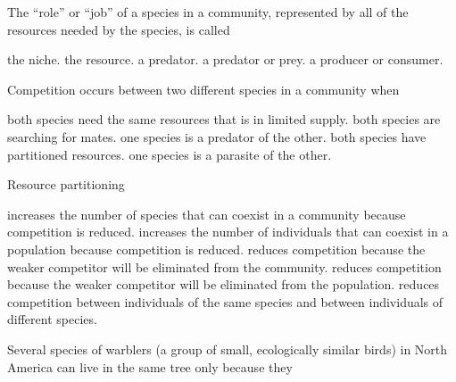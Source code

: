 
\question

\begin{choices}
\correctchoice   %
\choice  %
\choice  %
\choice  %
\choice  %
\end{choices}




\question
The ``role'' or ``job'' of a species in a community, represented by all of the resources needed by the species, is called 

\begin{choices}
	\correctchoice the niche.%
	\choice the resource.%
	\choice a predator.%
	\choice a predator or prey.%
	\choice a producer or consumer.%
\end{choices}


\question
Competition occurs between two different species in a community when

\begin{choices}
	\correctchoice both species need the same resources that is in limited supply.%
	\choice both species are searching for mates.%
	\choice one species is a predator of the other.%
	\choice both species have partitioned resources.%
	\choice one species is a parasite of the other.%
\end{choices}

\question
Resource partitioning

\begin{choices}
	\correctchoice increases the number of species that can coexist in a community because competition is reduced.%
	\choice increases the number of individuals that can coexist in a population because competition is reduced.%
	\choice reduces competition because the weaker competitor will be eliminated from the community.%
	\choice reduces competition because the weaker competitor will be eliminated from the population.%
	\choice reduces competition between individuals of the same species and between individuals of different species.%
\end{choices}

\question
Several species of warblers (a group of small, ecologically similar birds) in North America can live in the same tree only because they


